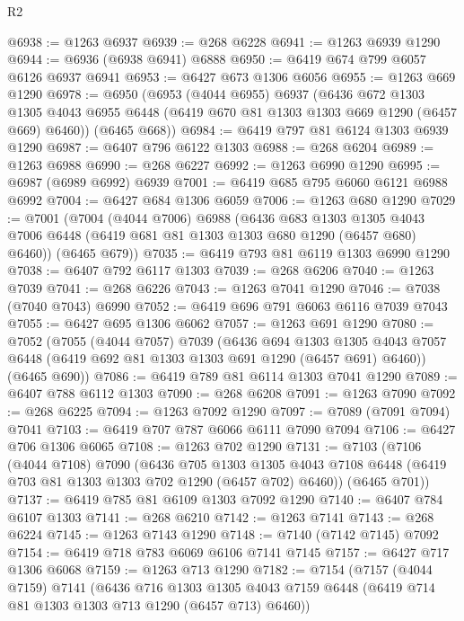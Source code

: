 \begin{lexlean}{R2}
\begin{coremodule}
@6938 := @1263 @6937
@6939 := @268 @6228
@6941 := @1263 @6939 @1290
@6944 := @6936 (@6938 @6941) @6888
@6950 := @6419 @674 @799 @6057 @6126 @6937 @6941
@6953 := @6427 @673 @1306 @6056
@6955 := @1263 @669 @1290
@6978 := @6950
    (@6953
      (@4044 @6955)
      @6937
      (@6436
        @672
        @1303
        @1305
        @4043
        @6955
        @6448
        (@6419 @670 @81 @1303 @1303 @669 @1290 (@6457 @669) @6460))
      (@6465 @668))
@6984 := @6419 @797 @81 @6124 @1303 @6939 @1290
@6987 := @6407 @796 @6122 @1303
@6988 := @268 @6204
@6989 := @1263 @6988
@6990 := @268 @6227
@6992 := @1263 @6990 @1290
@6995 := @6987 (@6989 @6992) @6939
@7001 := @6419 @685 @795 @6060 @6121 @6988 @6992
@7004 := @6427 @684 @1306 @6059
@7006 := @1263 @680 @1290
@7029 := @7001
    (@7004
      (@4044 @7006)
      @6988
      (@6436
        @683
        @1303
        @1305
        @4043
        @7006
        @6448
        (@6419 @681 @81 @1303 @1303 @680 @1290 (@6457 @680) @6460))
      (@6465 @679))
@7035 := @6419 @793 @81 @6119 @1303 @6990 @1290
@7038 := @6407 @792 @6117 @1303
@7039 := @268 @6206
@7040 := @1263 @7039
@7041 := @268 @6226
@7043 := @1263 @7041 @1290
@7046 := @7038 (@7040 @7043) @6990
@7052 := @6419 @696 @791 @6063 @6116 @7039 @7043
@7055 := @6427 @695 @1306 @6062
@7057 := @1263 @691 @1290
@7080 := @7052
    (@7055
      (@4044 @7057)
      @7039
      (@6436
        @694
        @1303
        @1305
        @4043
        @7057
        @6448
        (@6419 @692 @81 @1303 @1303 @691 @1290 (@6457 @691) @6460))
      (@6465 @690))
@7086 := @6419 @789 @81 @6114 @1303 @7041 @1290
@7089 := @6407 @788 @6112 @1303
@7090 := @268 @6208
@7091 := @1263 @7090
@7092 := @268 @6225
@7094 := @1263 @7092 @1290
@7097 := @7089 (@7091 @7094) @7041
@7103 := @6419 @707 @787 @6066 @6111 @7090 @7094
@7106 := @6427 @706 @1306 @6065
@7108 := @1263 @702 @1290
@7131 := @7103
    (@7106
      (@4044 @7108)
      @7090
      (@6436
        @705
        @1303
        @1305
        @4043
        @7108
        @6448
        (@6419 @703 @81 @1303 @1303 @702 @1290 (@6457 @702) @6460))
      (@6465 @701))
@7137 := @6419 @785 @81 @6109 @1303 @7092 @1290
@7140 := @6407 @784 @6107 @1303
@7141 := @268 @6210
@7142 := @1263 @7141
@7143 := @268 @6224
@7145 := @1263 @7143 @1290
@7148 := @7140 (@7142 @7145) @7092
@7154 := @6419 @718 @783 @6069 @6106 @7141 @7145
@7157 := @6427 @717 @1306 @6068
@7159 := @1263 @713 @1290
@7182 := @7154
    (@7157
      (@4044 @7159)
      @7141
      (@6436
        @716
        @1303
        @1305
        @4043
        @7159
        @6448
        (@6419 @714 @81 @1303 @1303 @713 @1290 (@6457 @713) @6460))

\end{coremodule}
\end{lexlean}
